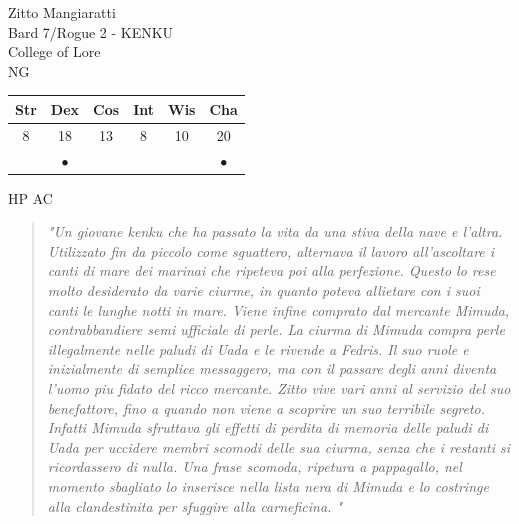 \documentclass[11pt]{article}
\newcommand*\circled[1]{\tikz[baseline=(char.base)]{
            \node[shape=circle,draw,inner sep=2pt] (char) {#1};}}
\begin{document}
\begin{minipage}{0.5\textwidth}%
\Huge{\Fontauri Zitto Mangiaratti} \\
\Large{Bard 7/Rogue 2 - KENKU} \\
\textcolor{OCRA}{College of Lore} \\
NG
\vspace{1cm}

\begin{tabular}{cccccc}
Str & Dex & Cos & Int & Wis & Cha \\ \hline
8 & 18 & 13 & 8 & 10 & 20\\ 
 & $\bullet$ & & & & $\bullet$
\end{tabular}

\vspace{1cm}
\textcolor{OCRA}{HP} \circled{58} \hspace{3cm} \textcolor{OCRA}{AC} \circled{15}
\end{minipage}
 
 \vspace{0.5cm}
 \begin{quote}
 \textit{\Fontauri"Un giovane kenku che ha passato la vita da una stiva della nave e l'altra. Utilizzato fin da piccolo come sguattero, alternava il lavoro all'ascoltare i canti di mare dei marinai che ripeteva poi alla perfezione. Questo lo rese molto desiderato da varie ciurme, in quanto poteva allietare con i suoi canti le lunghe notti in mare. Viene infine comprato dal mercante Mimuda, contrabbandiere semi ufficiale di perle. La ciurma di Mimuda compra perle illegalmente nelle paludi di Uada e le rivende a Fedris. Il suo ruole e inizialmente di semplice messaggero, ma con il passare degli anni diventa l'uomo piu fidato del ricco mercante. Zitto vive vari anni al servizio del suo benefattore, fino a quando non viene a scoprire un suo terribile segreto. Infatti Mimuda sfruttava gli effetti di perdita di memoria delle paludi di Uada per uccidere membri scomodi delle sua ciurma, senza che i restanti si ricordassero di nulla. Una frase scomoda, ripetura a pappagallo, nel momento sbagliato lo inserisce nella lista nera di Mimuda e lo costringe alla clandestinita per sfuggire alla carneficina.  "}  
 \end{quote}
\end{document}
